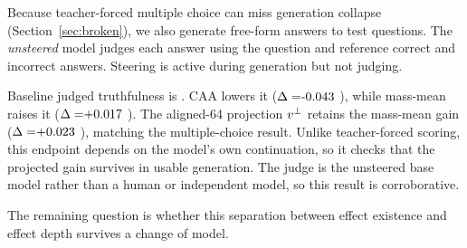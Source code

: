 Because teacher-forced multiple choice can miss generation collapse (Section~\ref{sec:broken}), we also generate free-form answers to \FreeGenN{} test questions. The \emph{unsteered} model judges each answer using the question and reference correct and incorrect answers. Steering is active during generation but not judging.

Baseline judged truthfulness is \FreeGenBase. CAA lowers it ($\Delta = \DecFreeGenVdecDelta$ \DecFreeGenVdecDeltaCI), while mass-mean raises it ($\Delta = \MmFreeGenVdecDelta$ \MmFreeGenVdecDeltaCI). The aligned-64 projection $v^{\perp}$ retains the mass-mean gain ($\Delta = \MmFreeGenVperpDelta$ \MmFreeGenVperpDeltaCI), matching the multiple-choice result. Unlike teacher-forced scoring, this endpoint depends on the model's own continuation, so it checks that the projected gain survives in usable generation. The judge is the unsteered base model rather than a human or independent model, so this result is corroborative.

The remaining question is whether this separation between effect existence and effect depth survives a change of model.
